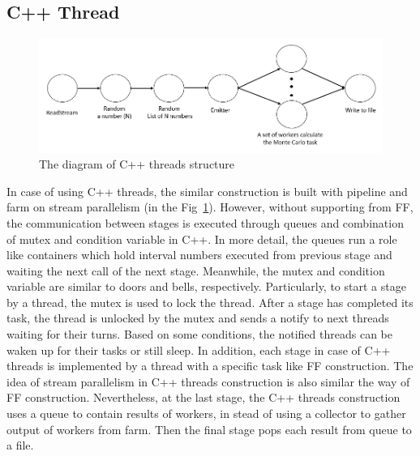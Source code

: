 \documentclass[runningheads,a4paper]{llncs}
\begin{document}
\subsection{C++ Thread}
\label{subsec:thread}

\begin{figure}[h!]
	\centering
	\includegraphics[scale = 0.4]{image/threadStructure}	
	\caption{The diagram of C++ threads structure}
	\label{Fig:threadStructure}
\end{figure}

In case of using C++ threads, the similar construction is built with pipeline and farm on stream parallelism (in the Fig~\ref{Fig:threadStructure}). 
However, without supporting from FF, the communication between stages is executed through queues and combination of mutex and condition variable in C++.
In more detail, the queues run a role like containers which hold interval numbers executed from previous stage and waiting the next call of the next stage.
Meanwhile, the mutex and condition variable are similar to doors and bells, respectively.
Particularly, to start a stage by a thread, the mutex is used to lock the thread.
After a stage has completed its task, the thread is unlocked by the mutex and sends a notify to next threads waiting for their turns.
Based on some conditions, the notified threads can be waken up for their tasks or still sleep.
In addition, each stage in case of C++ threads is implemented by a thread with a specific task like FF construction.
The idea of stream parallelism in C++ threads construction is also similar the way of FF construction. 
Nevertheless, at the last stage, the C++ threads construction uses a queue to contain results of workers, in stead of using a collector to gather output of workers from farm.
Then the final stage pops each result from queue to a file.


\end{document}
